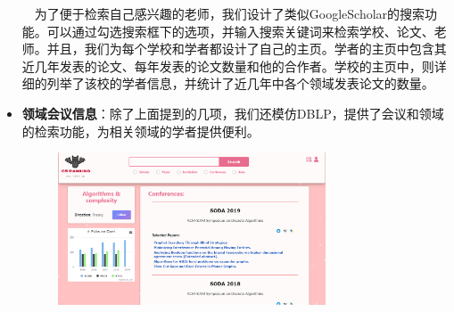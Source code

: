 \begin{itemize}
\begin{figure}[h]
\centering 
{}
\hspace{1cm}
\end{figure}

$\quad$为了便于检索自己感兴趣的老师，我们设计了类似GoogleScholar的搜索功能。可以通过勾选搜索框下的选项，并输入搜索关键词来检索学校、论文、老师。并且，我们为每个学校和学者都设计了自己的主页。学者的主页中包含其近几年发表的论文、每年发表的论文数量和他的合作者。学校的主页中，则详细的列举了该校的学者信息，并统计了近几年中各个领域发表论文的数量。

\item {\bf 领域会议信息}：除了上面提到的几项，我们还模仿DBLP，提供了会议和领域的检索功能，为相关领域的学者提供便利。


\begin{figure}[h]
\centering
\includegraphics[width=0.75\textwidth]{asset/area.png}
\end{figure}


\end{itemize}
